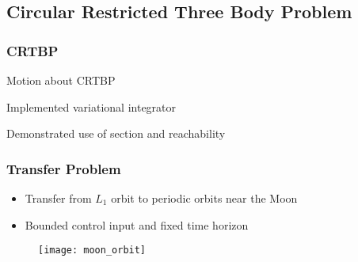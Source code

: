 
\subsection*{Circular Restricted Three Body Problem}
\begin{frame}[t]\frametitle{CRTBP}
    Motion about CRTBP

    Implemented variational integrator

    Demonstrated use of \Poincare section and reachability



\end{frame}

\begin{frame}%
\frametitle{Transfer Problem}
    \begin{itemize}
        \item Transfer from \( L_1 \) orbit to periodic orbits near the Moon
        \item Bounded control input and fixed time horizon
    \end{itemize}
    \begin{figure}
        \texttt{[image: moon\_orbit]}
    \end{figure}
    
\end{frame} %

